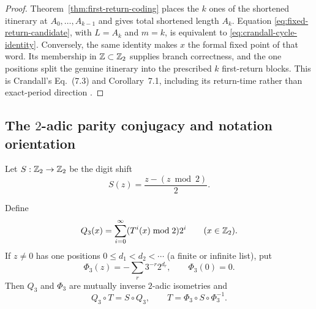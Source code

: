 \begin{proof}
Theorem~\ref{thm:first-return-coding} places the $k$ ones of the shortened
itinerary at $A_0,\ldots,A_{k-1}$ and gives total shortened length $A_k$.
Equation \eqref{eq:fixed-return-candidate}, with $L=A_k$ and $m=k$, is
equivalent to \eqref{eq:crandall-cycle-identity}.  Conversely, the same
identity makes $x$ the formal fixed point of that word.  Its membership in
$\mathbb{Z}\subset\mathbb{Z}_{2}$ supplies branch correctness, and the one positions split the
genuine itinerary into the prescribed $k$ first-return blocks.  This is
Crandall's Eq.~(7.3) and Corollary~7.1, including its return-time rather than
exact-period direction \cite[pp.~1287--1288]{Crandall1978}.
\end{proof}





\subsection{The \texorpdfstring{$2$}{2}-adic parity conjugacy and notation
orientation}

Let $S:\mathbb{Z}_{2}\to\mathbb{Z}_{2}$ be the digit shift
\[
 S(z)=\frac{z-(z\bmod2)}2.
\]

\begin{proposition}
\label{prop:BL-Q}
Define
\begin{equation}
\label{eq:BL-Q}
 Q_3(x)=\sum_{i=0}^{\infty}(T^i(x)\bmod2)2^i
 \qquad(x\in\mathbb{Z}_{2}).
\end{equation}
If $z\ne0$ has one positions
$0\leq d_1<d_2<\cdots$ (a finite or infinite list), put
\begin{equation}
\label{eq:BL-Phi}
 \Phi_3(z)=-\sum_{r}3^{-r}2^{d_r},
 \qquad \Phi_3(0)=0.
\end{equation}
Then $Q_3$ and $\Phi_3$ are mutually inverse $2$-adic isometries and
\begin{equation}
\label{eq:BL-conjugacy}
 Q_3\circ T=S\circ Q_3,
 \qquad
 T=\Phi_3\circ S\circ\Phi_3^{-1}.
\end{equation}
\end{proposition}

